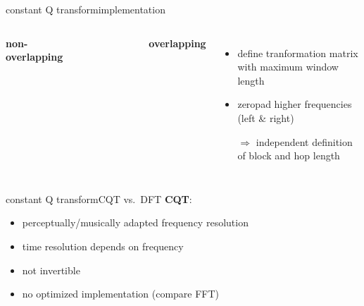         \begin{frame}{constant Q transform}{implementation}
            \vspace{-5mm}
            \begin{columns}
                    \vspace{-5mm}
                    \begin{center}\textbf{non-overlapping}\end{center}
                    \vspace{-8mm}
                    \begin{figure}
                        
                    \end{figure}
                    \vspace{-5mm}
                    \begin{center}\textbf{overlapping}\end{center}
                    \vspace{20mm}
                    \begin{itemize}
                        \item   define tranformation matrix with maximum window length
                        \item   zeropad higher frequencies (left \& right)
                        \bigskip
                        \item[$\Rightarrow$] independent definition of block and hop length
                    \end{itemize}
                    \vspace{15mm}
                \end{columns}
        \end{frame}	

        \begin{frame}{constant Q transform}{CQT vs.\ DFT}
            \textbf{CQT}:
            \bigskip
            \begin{itemize}
                \item<1->[+]	perceptually/musically adapted frequency resolution
                \smallskip
                \item<2->[--]	time resolution depends on frequency
                \smallskip
                \item<3->[--]	not invertible
                \smallskip
                \item<4->[--]	no optimized implementation (compare FFT)
            \end{itemize}
        \end{frame}	

